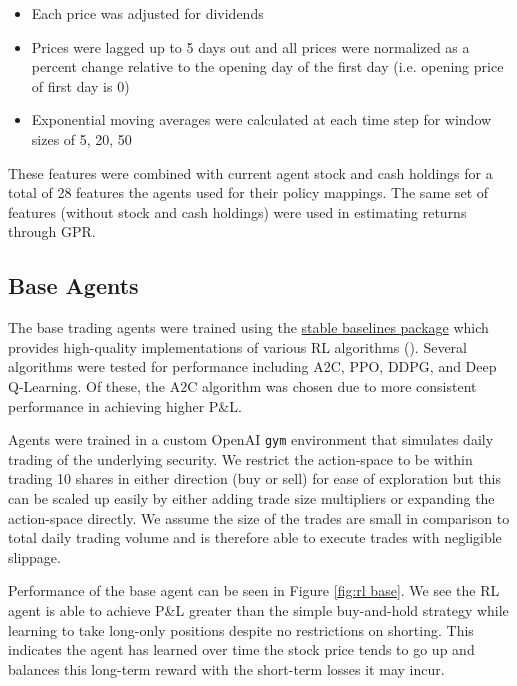 \documentclass[12pt]{article}
\def\code#1{\texttt{#1}}
\begin{document}
\begin{itemize}
	\item Each price was adjusted for dividends
	\item Prices were lagged up to 5 days out and all prices were normalized as a percent change relative to the opening day of the first day (i.e. opening price of first day is 0)
	\item Exponential moving averages were calculated at each time step for window sizes of 5, 20, 50
\end{itemize}

These features were combined with current agent stock and cash holdings for a total of 28 features the agents used for their policy mappings. The same set of features (without stock and cash holdings) were used in estimating returns through GPR.

\subsection{Base Agents}

The base trading agents were trained using the \href{https://github.com/hill-a/stable-baselines}{stable baselines package} which provides high-quality implementations of various RL algorithms (\cite{stable-baselines}). Several algorithms were tested for performance including A2C, PPO, DDPG, and Deep Q-Learning. Of these, the A2C algorithm was chosen due to more consistent performance in achieving higher P\&L.

Agents were trained in a custom OpenAI \code{gym} environment that simulates daily trading of the underlying security. We restrict the action-space to be within trading 10 shares in either direction (buy or sell) for ease of exploration but this can be scaled up easily by either adding trade size multipliers or expanding the action-space directly. We assume the size of the trades are small in comparison to total daily trading volume and is therefore able to execute trades with negligible slippage.

Performance of the base agent can be seen in Figure \ref{fig:rl base}. We see the RL agent is able to achieve P\&L greater than the simple buy-and-hold strategy while learning to take long-only positions despite no restrictions on shorting. This indicates the agent has learned over time the stock price tends to go up and balances this long-term reward with the short-term losses it may incur.
\end{document}
